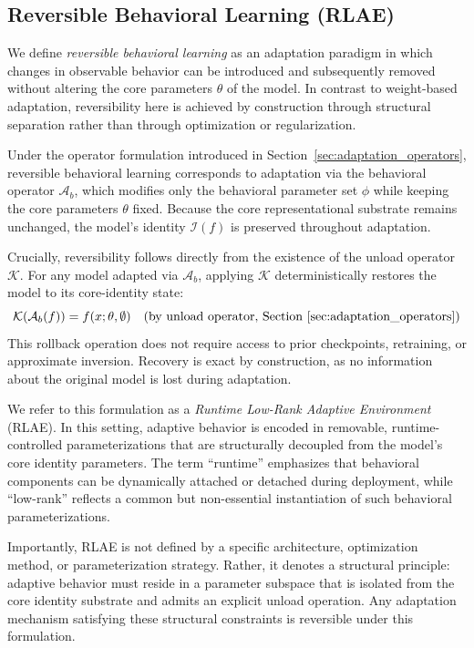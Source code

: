 \documentclass{article}
\begin{document}
	
	\subsection{Reversible Behavioral Learning (RLAE)}
	\label{sec:rlae}
	
	We define \emph{reversible behavioral learning} as an adaptation paradigm in which changes in observable behavior can be introduced and subsequently removed without altering the core parameters $\theta$ of the model. In contrast to weight-based adaptation, reversibility here is achieved by construction through structural separation rather than through optimization or regularization.
	
	Under the operator formulation introduced in Section~\ref{sec:adaptation_operators}, reversible behavioral learning corresponds to adaptation via the behavioral operator $\mathcal{A}_b$, which modifies only the behavioral parameter set $\phi$ while keeping the core parameters $\theta$ fixed. Because the core representational substrate remains unchanged, the model’s identity $\mathcal{I}(f)$ is preserved throughout adaptation.
	
	Crucially, reversibility follows directly from the existence of the unload operator $\mathcal{K}$. For any model adapted via $\mathcal{A}_b$, applying $\mathcal{K}$ deterministically restores the model to its core-identity state:
	\[
	\mathcal{K}(\mathcal{A}_b(f)) = f(x;\theta,\emptyset)
	\quad \text{(by unload operator, Section~\ref{sec:adaptation_operators})}
	\]
	This rollback operation does not require access to prior checkpoints, retraining, or approximate inversion. Recovery is exact by construction, as no information about the original model is lost during adaptation.
	
	We refer to this formulation as a \emph{Runtime Low-Rank Adaptive Environment} (RLAE). In this setting, adaptive behavior is encoded in removable, runtime-controlled parameterizations that are structurally decoupled from the model's core identity parameters. The term “runtime” emphasizes that behavioral components can be dynamically attached or detached during deployment, while “low-rank” reflects a common but non-essential instantiation of such behavioral parameterizations.
	
	Importantly, RLAE is not defined by a specific architecture, optimization method, or parameterization strategy. Rather, it denotes a structural principle: adaptive behavior must reside in a parameter subspace that is isolated from the core identity substrate and admits an explicit unload operation. Any adaptation mechanism satisfying these structural constraints is reversible under this formulation.
	
\end{document}
